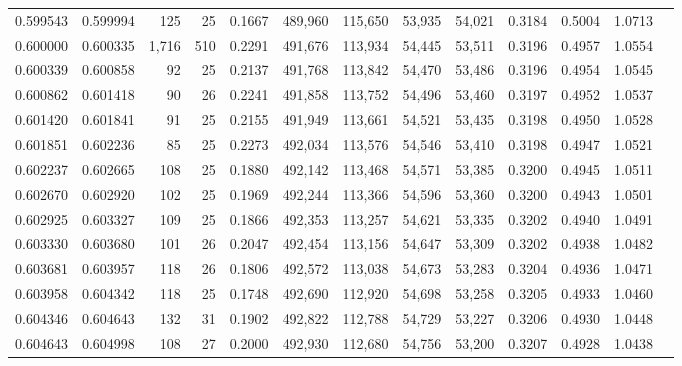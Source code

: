 \begin{tabular}{rrrrrrrrrrrrr}
0.599543 & 0.599994 &   125 &  25 &                                     0.1667 & 489,960 & 115,650 &  53,935 &  54,021 & 0.3184 & 0.5004 & 1.0713 \\
0.600000 & 0.600335 & 1,716 & 510 &                                     0.2291 & 491,676 & 113,934 &  54,445 &  53,511 & 0.3196 & 0.4957 & 1.0554 \\
0.600339 & 0.600858 &    92 &  25 &                                     0.2137 & 491,768 & 113,842 &  54,470 &  53,486 & 0.3196 & 0.4954 & 1.0545 \\
0.600862 & 0.601418 &    90 &  26 &                                     0.2241 & 491,858 & 113,752 &  54,496 &  53,460 & 0.3197 & 0.4952 & 1.0537 \\
0.601420 & 0.601841 &    91 &  25 &                                     0.2155 & 491,949 & 113,661 &  54,521 &  53,435 & 0.3198 & 0.4950 & 1.0528 \\
0.601851 & 0.602236 &    85 &  25 &                                     0.2273 & 492,034 & 113,576 &  54,546 &  53,410 & 0.3198 & 0.4947 & 1.0521 \\
0.602237 & 0.602665 &   108 &  25 &                                     0.1880 & 492,142 & 113,468 &  54,571 &  53,385 & 0.3200 & 0.4945 & 1.0511 \\
0.602670 & 0.602920 &   102 &  25 &                                     0.1969 & 492,244 & 113,366 &  54,596 &  53,360 & 0.3200 & 0.4943 & 1.0501 \\
0.602925 & 0.603327 &   109 &  25 &                                     0.1866 & 492,353 & 113,257 &  54,621 &  53,335 & 0.3202 & 0.4940 & 1.0491 \\
0.603330 & 0.603680 &   101 &  26 &                                     0.2047 & 492,454 & 113,156 &  54,647 &  53,309 & 0.3202 & 0.4938 & 1.0482 \\
0.603681 & 0.603957 &   118 &  26 &                                     0.1806 & 492,572 & 113,038 &  54,673 &  53,283 & 0.3204 & 0.4936 & 1.0471 \\
0.603958 & 0.604342 &   118 &  25 &                                     0.1748 & 492,690 & 112,920 &  54,698 &  53,258 & 0.3205 & 0.4933 & 1.0460 \\
0.604346 & 0.604643 &   132 &  31 &                                     0.1902 & 492,822 & 112,788 &  54,729 &  53,227 & 0.3206 & 0.4930 & 1.0448 \\
0.604643 & 0.604998 &   108 &  27 &                                     0.2000 & 492,930 & 112,680 &  54,756 &  53,200 & 0.3207 & 0.4928 & 1.0438 \\

\end{tabular}
